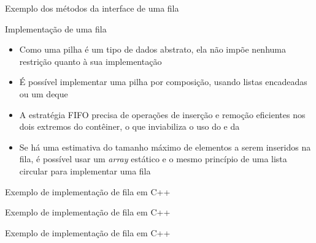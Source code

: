 \begin{frame}[fragile]{Exemplo dos métodos da interface de uma fila}


\end{frame}

\begin{frame}[fragile]{Implementação de uma fila}

    \begin{itemize}
        \item Como uma pilha é um tipo de dados abstrato, ela não impõe nenhuma restrição
            quanto à sua implementação

        \item É possível implementar uma pilha por composição, usando listas encadeadas ou um
            deque

        \item A estratégia FIFO precisa de operações de inserção e remoção eficientes nos
            dois extremos do contêiner, o que inviabiliza o uso do  e da

        \item Se há uma estimativa do tamanho máximo de elementos a serem inseridos na fila,
            é possível usar um \textit{array} estático e o mesmo princípio de uma lista circular 
            para implementar uma fila
    \end{itemize}

\end{frame}

\begin{frame}[fragile]{Exemplo de implementação de fila em C++}
\end{frame}

\begin{frame}[fragile]{Exemplo de implementação de fila em C++}
\end{frame}

\begin{frame}[fragile]{Exemplo de implementação de fila em C++}
\end{frame}

